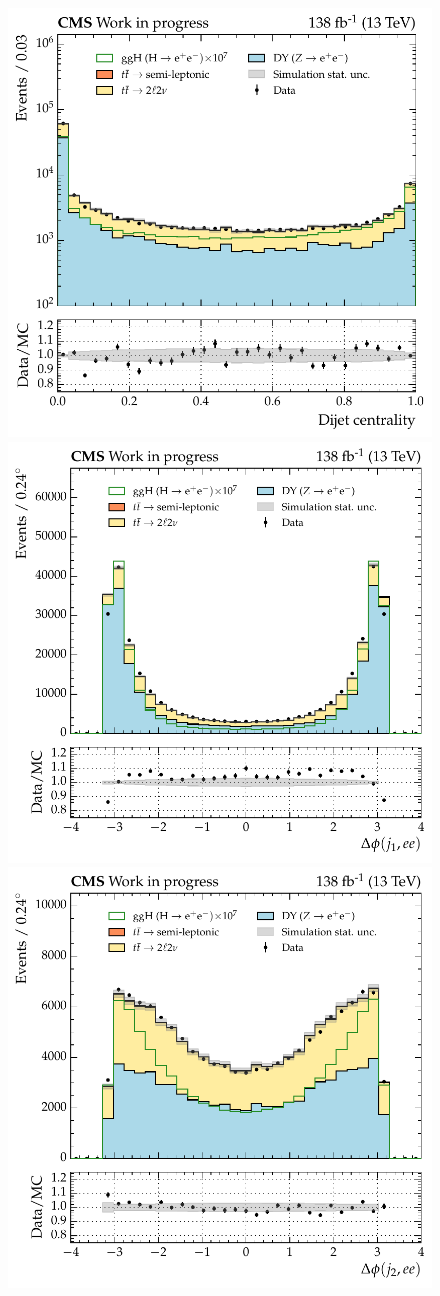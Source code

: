 \begin{figure}[htbp!]
\includegraphics[width =0.33\linewidth]{Figures/Hee/ggH/dataMC/all_inputs/ggH_BDT_pt_reweighted_dijetCentrality.pdf}\hfill%
\includegraphics[width =0.33\linewidth]{Figures/Hee/ggH/dataMC/all_inputs/ggH_BDT_pt_reweighted_leadJetDieleDPhi.pdf}\hfill%
\includegraphics[width =0.33\linewidth]{Figures/Hee/ggH/dataMC/all_inputs/ggH_BDT_pt_reweighted_subleadJetDieleDPhi.pdf}\hfill%
 

\end{figure}
